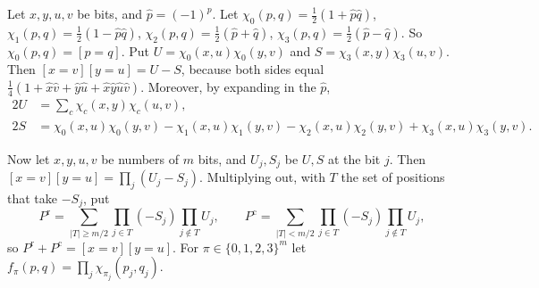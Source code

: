 \documentclass[10pt]{article}
\begin{document}
Let $x,y,u,v$ be bits, and $\hat p=(-1)^p$. Let $\chi_0(p,q)=\tfrac12(1+\hat p\hat q)$, $\chi_1(p,q)=\tfrac12(1-\hat p\hat q)$, $\chi_2(p,q)=\tfrac12(\hat p+\hat q)$, $\chi_3(p,q)=\tfrac12(\hat p-\hat q)$. So $\chi_0(p,q)=[p=q]$. Put $U=\chi_0(x,u)\chi_0(y,v)$ and $S=\chi_3(x,y)\chi_3(u,v)$. Then $[x=v][y=u]=U-S$, because both sides equal $\tfrac14(1+\hat x\hat v+\hat y\hat u+\hat x\hat y\hat u\hat v)$. Moreover, by expanding in the $\hat p$,
\begin{align*}
2U&=\sum_{c}\chi_c(x,y)\chi_c(u,v),\\
2S&=\chi_0(x,u)\chi_0(y,v)-\chi_1(x,u)\chi_1(y,v)-\chi_2(x,u)\chi_2(y,v)+\chi_3(x,u)\chi_3(y,v).
\end{align*}

Now let $x,y,u,v$ be numbers of $m$ bits, and $U_j,S_j$ be $U,S$ at the bit $j$. Then $[x=v][y=u]=\prod_j(U_j-S_j)$. Multiplying out, with $T$ the set of positions that take $-S_j$, put
\[
P^{\mathrm r}=\sum_{|T|\ge m/2}\prod_{j\in T}(-S_j)\prod_{j\notin T}U_j,\qquad P^{\mathrm c}=\sum_{|T|<m/2}\prod_{j\in T}(-S_j)\prod_{j\notin T}U_j,
\]
so $P^{\mathrm r}+P^{\mathrm c}=[x=v][y=u]$. For $\pi\in\{0,1,2,3\}^m$ let $f_\pi(p,q)=\prod_j\chi_{\pi_j}(p_j,q_j)$.
\end{document}
